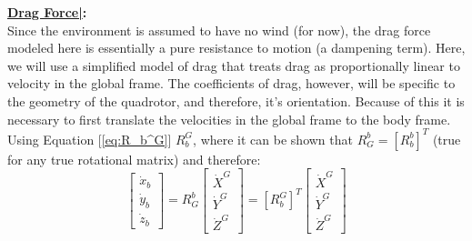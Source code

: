 \documentclass[conf]{new-aiaa}
\begin{document}
\noindent\textbf{ \ul{Drag Force|}:}\vspace{0.2cm}\\
\noindent Since the environment is assumed to have no wind (for now), the drag force modeled here is essentially a pure resistance to motion (a dampening term). Here, we will use a simplified model of drag that treats drag as proportionally linear to velocity in the global frame. The coefficients of drag, however, will be specific to the geometry of the quadrotor, and therefore, it's orientation. Because of this it is necessary to first translate the velocities in the global frame to the body frame. Using Equation [\ref{eq:R_b^G}] $R_b^G$, where it can be shown that $R_G^b = [R_b^b]^T$ (true for any true rotational matrix) and therefore: $$\begin{bmatrix} \dot{x}_b\\\dot{y}_b\\\dot{z}_b\end{bmatrix}=R_G^b\begin{bmatrix} \dot{X}^G\\\dot{Y}^G\\\dot{Z}^G\end{bmatrix} = [R_b^G]^T \begin{bmatrix}\dot{X}^G\\\dot{Y}^G\\\dot{Z}^G \end{bmatrix}$$ 
\end{document}

